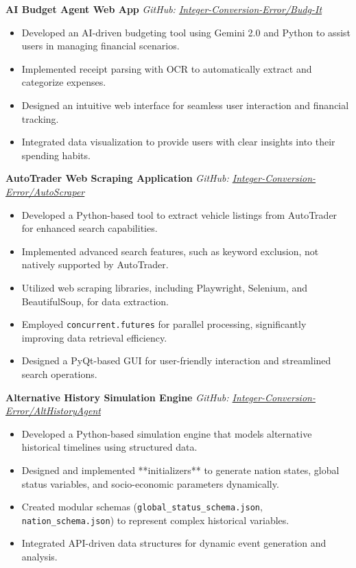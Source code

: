 \documentclass[11pt]{article}
\begin{document}
\textbf{AI Budget Agent Web App} \hfill \textit{GitHub: \href{https://github.com/Integer-Conversion-Error/Budg-It}{Integer-Conversion-Error/Budg-It}}
\begin{itemize}
    \item Developed an AI-driven budgeting tool using Gemini 2.0 and Python to assist users in managing financial scenarios.
    \item Implemented receipt parsing with OCR to automatically extract and categorize expenses.
    \item Designed an intuitive web interface for seamless user interaction and financial tracking.
    \item Integrated data visualization to provide users with clear insights into their spending habits.
\end{itemize}


\textbf{AutoTrader Web Scraping Application} \hfill \textit{GitHub: \href{https://github.com/Integer-Conversion-Error/AutoScraper}{Integer-Conversion-Error/AutoScraper}}
\begin{itemize}
    \item Developed a Python-based tool to extract vehicle listings from AutoTrader for enhanced search capabilities.
    \item Implemented advanced search features, such as keyword exclusion, not natively supported by AutoTrader.
    \item Utilized web scraping libraries, including Playwright, Selenium, and BeautifulSoup, for data extraction.
    \item Employed \texttt{concurrent.futures} for parallel processing, significantly improving data retrieval efficiency.
    \item Designed a PyQt-based GUI for user-friendly interaction and streamlined search operations.
\end{itemize}


\textbf{Alternative History Simulation Engine} \hfill \textit{GitHub: \href{https://github.com/Integer-Conversion-Error/AltHistoryAgent}{Integer-Conversion-Error/AltHistoryAgent}}
\begin{itemize}
    \item Developed a Python-based simulation engine that models alternative historical timelines using structured data.
    \item Designed and implemented **initializers** to generate nation states, global status variables, and socio-economic parameters dynamically.
    \item Created modular schemas (\texttt{global\_status\_schema.json}, \texttt{nation\_schema.json}) to represent complex historical variables.
    \item Integrated API-driven data structures for dynamic event generation and analysis.
\end{itemize}
\end{document}
